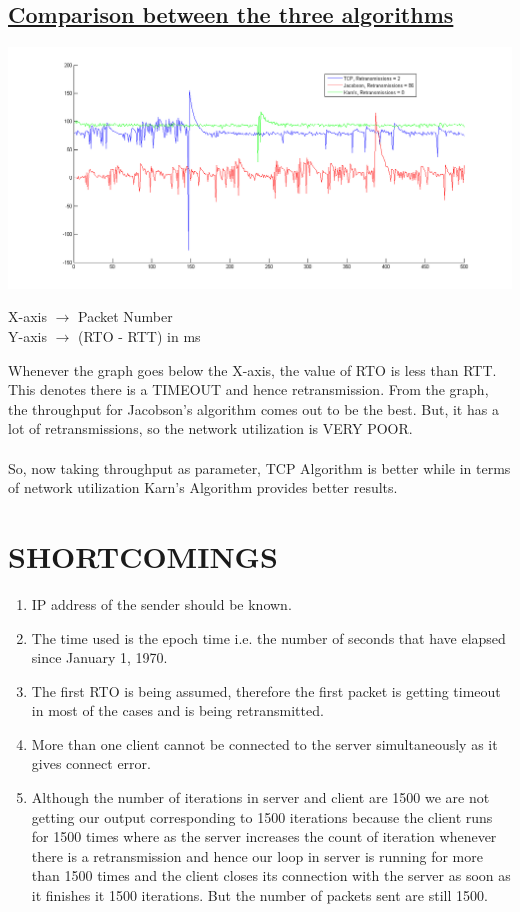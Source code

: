 \documentclass[12pt]{article}
\begin{document}
\subsection{\underline{Comparison between the three algorithms}}
\begin{center}
 \includegraphics[scale=0.5]{algocmp.png}
\end{center}
\begin{center}
X-axis $\rightarrow$ Packet Number\\
Y-axis $\rightarrow$ (RTO - RTT) in ms
\end{center}
Whenever the graph goes below the X-axis, the value of RTO is less than RTT. This denotes there is a TIMEOUT and hence retransmission. From the graph, the throughput for Jacobson’s algorithm comes out to be the best. But, it has a lot of retransmissions, so the network utilization is VERY POOR.\\ \\
So, now taking throughput as parameter, TCP Algorithm is better while in terms of network utilization Karn’s Algorithm provides better results.   

\section{SHORTCOMINGS}
\begin{enumerate}
\item IP address of the sender should be known.
\item The time used is the epoch time i.e. the number of seconds that have elapsed since  January 1, 1970.
\item The first RTO is being assumed, therefore the first packet is getting timeout in most of the cases and is being retransmitted.
\item More than one client cannot be connected to the server simultaneously as it gives connect error.
\item Although the number of iterations in server and client are 1500 we are not getting our output corresponding to 1500 iterations because the client runs for 1500 times where as the server increases the count of iteration whenever there is a retransmission and hence our loop in server is running for more than 1500 times and the client closes its connection with the server as soon as it finishes it 1500 iterations. But the number of packets sent are still 1500.
\end{enumerate}
\end{document}
